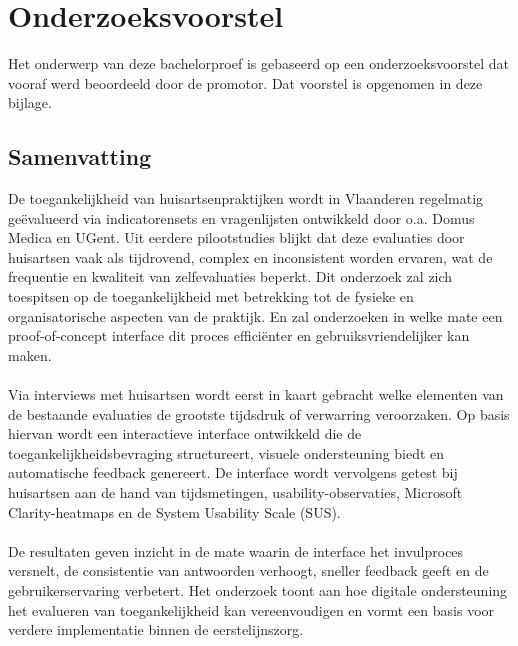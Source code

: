 \documentclass[dutch,dit,thesis]{hogentreport}
\begin{document}









%
%




\appendix

\chapter{Onderzoeksvoorstel}

Het onderwerp van deze bachelorproef is gebaseerd op een onderzoeksvoorstel dat vooraf werd beoordeeld door de promotor. Dat voorstel is opgenomen in deze bijlage.

\section*{Samenvatting}


  De toegankelijkheid van huisartsenpraktijken wordt in Vlaanderen regelmatig geëvalueerd via indicatorensets en vragenlijsten ontwikkeld door o.a. Domus Medica en UGent.
  Uit eerdere pilootstudies blijkt dat deze evaluaties door huisartsen vaak als tijdrovend, complex en inconsistent worden ervaren, wat de frequentie en kwaliteit van zelfevaluaties beperkt.
  Dit onderzoek zal zich toespitsen op de toegankelijkheid met betrekking tot de fysieke en organisatorische aspecten van de praktijk.
  En zal onderzoeken in welke mate een proof-of-concept interface dit proces efficiënter en gebruiksvriendelijker kan maken.\\\\
  Via interviews met huisartsen wordt eerst in kaart gebracht welke elementen van de bestaande evaluaties de grootste tijdsdruk of verwarring veroorzaken.
  Op basis hiervan wordt een interactieve interface ontwikkeld die de toegankelijkheidsbevraging structureert, visuele ondersteuning biedt en automatische feedback genereert.
  De interface wordt vervolgens getest bij huisartsen aan de hand van tijdsmetingen, usability-observaties, Microsoft Clarity-heatmaps en de System Usability Scale (SUS).\\\\
  De resultaten geven inzicht in de mate waarin de interface het invulproces versnelt, de consistentie van antwoorden verhoogt, sneller feedback geeft en de gebruikerservaring verbetert.
  Het onderzoek toont aan hoe digitale ondersteuning het evalueren van toegankelijkheid kan vereenvoudigen en vormt een basis voor verdere implementatie binnen de eerstelijnszorg.
\end{document}
